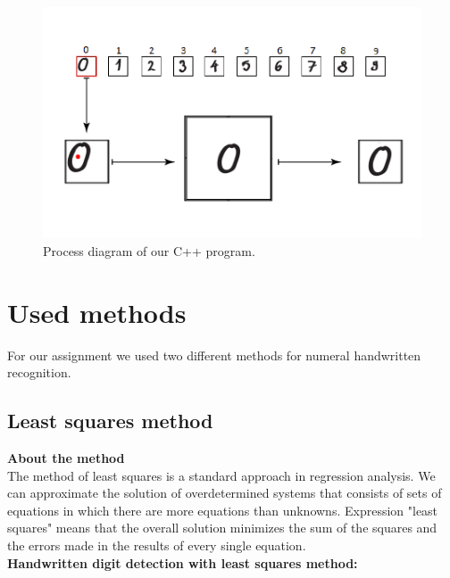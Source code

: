 \documentclass[12pt]{article}
\begin{document}
\newpage
\begin{figure}[h]
	\centering
	\includegraphics[clip,scale=0.9]{images/diagram.png}
	\caption[Process diagram of our C++ program]{Process diagram of our C++ program.}
	
\end{figure}



\newpage
\section{Used methods}
For our assignment we used two different methods for numeral handwritten recognition.
\subsection{Least squares method}
\textbf{About the method}\\
\newline
The method of least squares is a standard approach in regression analysis. We can approximate the solution of overdetermined systems that consists of sets of equations in which there are more equations than unknowns. Expression "least squares" means that the overall solution minimizes the sum of the squares and the errors made in the results of every single equation.\\
\newline
\textbf{Handwritten digit detection with least squares method:}
\end{document}
